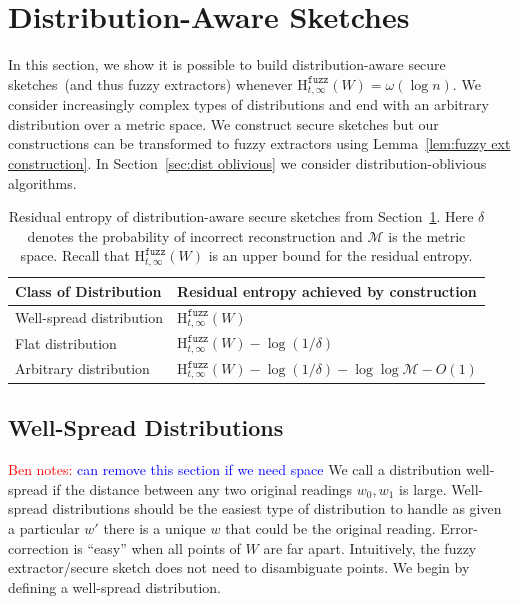 \documentclass[11pt]{article}
\newcommand{\secref}[1]{\mbox{Section~\ref{#1}}}
\newcommand{\lemref}[1]{\mbox{Lemma~\ref{#1}}}
\newcommand{\Hfuzz}{\mathrm{H}^{\mathtt{fuzz}}_{t,\infty}}
\newcommand{\authnote}[2]{{\textcolor{red}{\textsf{#1 notes: }\textcolor{blue}{ #2}}\marginpar{\textcolor{red}{\textbf{!!!!!}}}}}
\newcommand{\authnote}[2]{}
\newcommand{\bnote}[1]{{\authnote{Ben}{#1}}}
\begin{document}
\section{Distribution-Aware  Sketches}
\label{sec:distribution aware}
In this section, we show it is possible to build distribution-aware secure sketches~(and thus fuzzy extractors) whenever $\Hfuzz(W)= \omega(\log n)$.
We consider increasingly complex types of distributions and end with an arbitrary distribution over a metric space.  We construct secure sketches but our constructions can be transformed to fuzzy extractors using \lemref{lem:fuzzy ext construction}.  In \secref{sec:dist oblivious} we consider distribution-oblivious algorithms.  



\begin{table}
\begin{centering}
\begin{tabular}{l | l}
Class of Distribution & Residual entropy achieved by construction\\
\hline
Well-spread distribution & $\Hfuzz(W)$ \\
Flat distribution & $\Hfuzz(W) - \log (1/\delta)$ \\
Arbitrary distribution & $\Hfuzz(W) - \log (1/\delta) - \log \log \mathcal{M}- O(1)$
\end{tabular}
\caption{Residual entropy of distribution-aware secure sketches from \secref{sec:distribution aware}.    Here $\delta$ denotes the probability of incorrect reconstruction and $\mathcal{M}$ is the metric space.  Recall that $\Hfuzz(W)$ is an upper bound for the residual entropy.}
\label{tab:upper bounds}
\end{centering}
\end{table}

\subsection{Well-Spread Distributions}
\bnote{can remove this section if we need space}
We call a distribution well-spread if the distance between any two original readings $w_0, w_1$ is large.  Well-spread distributions should be the easiest type of distribution to handle as given a particular $w'$ there is a unique $w$ that could be the original reading.  Error-correction is ``easy'' when all points of $W$ are far apart.  Intuitively, the fuzzy extractor/secure sketch does not need to disambiguate points.  %
We begin by defining a well-spread distribution.
\end{document}
